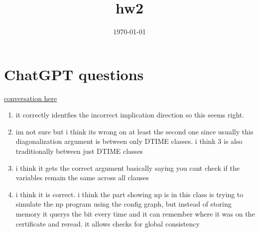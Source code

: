 \documentclass{article}
\title{hw2}
\date{\today}
\begin{document}
\maketitle

\section{ChatGPT questions} 

\href{https://chatgpt.com/share/6919446d-d47c-800d-814e-a3be7f325749}{conversation here}

\begin{enumerate}
    \item it correctly identfies the incorrect implication direction so this seems right.
    \item im not sure but i think its wrong on at least the second one since usually this diagonalization argument is between only DTIME classes. i think 3 is also traditionally between just DTIME classes
    \item i think it gets the correct argument basically saying you cant check if the variables remain the same across all clauses
    \item i think it is correct. i think the part showing np is in this class is trying to simulate the np program using the config graph, but instead of storing memory it querys the bit every time and it can remember where it was on the certificate and reread. it allows checks for global consistency
\end{enumerate}
\end{document}
